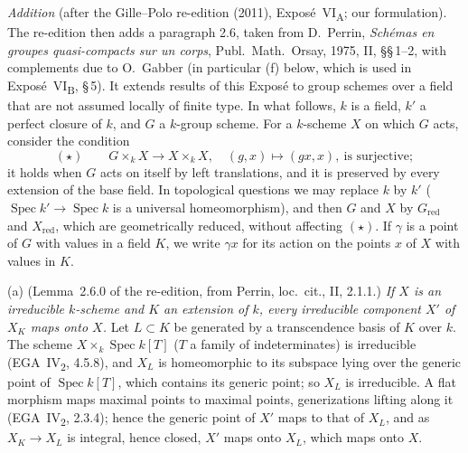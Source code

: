 
\medskip\noindent
\emph{Addition} (after the Gille--Polo re-edition (2011), Exposé~VI\textsubscript{A}; our
formulation). The re-edition then adds a paragraph 2.6, taken from D.~Perrin, \emph{Schémas en groupes
quasi-compacts sur un corps}, Publ.\ Math.\ Orsay, 1975, II, \S\S\,1--2, with complements due to
O.~Gabber (in particular (f) below, which is used in Exposé~VI\textsubscript{B}, \S\,5). It extends
results of this Exposé to group schemes over a field that are not assumed locally of finite type. In
what follows, \(k\) is a field, \(k'\) a perfect closure of \(k\), and \(G\) a \(k\)-group scheme.
For a \(k\)-scheme \(X\) on which \(G\) acts, consider the condition
\[
  (\star)\qquad G\times_kX\longrightarrow X\times_kX,\quad (g,x)\longmapsto(gx,x),
  \ \text{is surjective};
\]
it holds when \(G\) acts on itself by left translations, and it is preserved by every extension of
the base field. In topological questions we may replace \(k\) by \(k'\)
(\(\operatorname{Spec}k'\to\operatorname{Spec}k\) is a universal homeomorphism), and then \(G\) and
\(X\) by \(G_{\mathrm{red}}\) and \(X_{\mathrm{red}}\), which are geometrically reduced, without
affecting \((\star)\). If \(\gamma\) is a point of \(G\) with values in a field \(K\), we write
\(\gamma x\) for its action on the points \(x\) of \(X\) with values in \(K\).

(a) (Lemma~2.6.0 of the re-edition, from Perrin, loc.\ cit., II, 2.1.1.) \emph{If \(X\) is an
irreducible \(k\)-scheme and \(K\) an extension of \(k\), every irreducible component \(X'\) of
\(X_K\) maps onto \(X\).} Let \(L\subset K\) be generated by a transcendence basis of \(K\) over
\(k\). The scheme \(X\times_k\operatorname{Spec}k[T]\) (\(T\) a family of indeterminates) is
irreducible (EGA~IV\textsubscript{2}, 4.5.8), and \(X_L\) is homeomorphic to its subspace lying over
the generic point of \(\operatorname{Spec}k[T]\), which contains its generic point; so \(X_L\) is
irreducible. A flat morphism maps maximal points to maximal points, generizations lifting along it
(EGA~IV\textsubscript{2}, 2.3.4); hence the generic point of \(X'\) maps to that of \(X_L\), and as
\(X_K\to X_L\) is integral, hence closed, \(X'\) maps onto \(X_L\), which maps onto \(X\).

